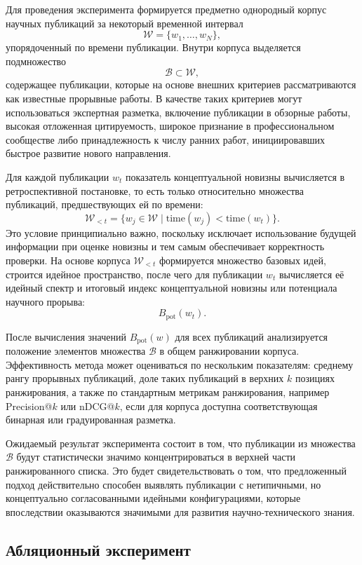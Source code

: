 \documentclass[review,3p,times]{elsarticle}
\begin{document}
Для проведения эксперимента формируется предметно однородный корпус научных публикаций за некоторый временной интервал
\[
\mathcal{W}=\{w_1,\dots,w_N\},
\]
упорядоченный по времени публикации. Внутри корпуса выделяется подмножество
\[
\mathcal{B}\subset \mathcal{W},
\]
содержащее публикации, которые на основе внешних критериев рассматриваются как известные прорывные работы. В качестве таких критериев могут использоваться экспертная разметка, включение публикации в обзорные работы, высокая отложенная цитируемость, широкое признание в профессиональном сообществе либо принадлежность к числу ранних работ, инициировавших быстрое развитие нового направления.

Для каждой публикации $w_t$ показатель концептуальной новизны вычисляется в ретроспективной постановке, то есть только относительно множества публикаций, предшествующих ей по времени:
\[
\mathcal{W}_{<t}=\{w_j \in \mathcal{W}\mid \mathrm{time}(w_j)<\mathrm{time}(w_t)\}.
\]
Это условие принципиально важно, поскольку исключает использование будущей информации при оценке новизны и тем самым обеспечивает корректность проверки. На основе корпуса $\mathcal{W}_{<t}$ формируется множество базовых идей, строится идейное пространство, после чего для публикации $w_t$ вычисляется её идейный спектр и итоговый индекс концептуальной новизны или потенциала научного прорыва:
\[
B_{\mathrm{pot}}(w_t).
\]

После вычисления значений $B_{\mathrm{pot}}(w)$ для всех публикаций анализируется положение элементов множества $\mathcal{B}$ в общем ранжировании корпуса. Эффективность метода может оцениваться по нескольким показателям: среднему рангу прорывных публикаций, доле таких публикаций в верхних $k$ позициях ранжирования, а также по стандартным метрикам ранжирования, например Precision@$k$ или nDCG@$k$, если для корпуса доступна соответствующая бинарная или градуированная разметка.

Ожидаемый результат эксперимента состоит в том, что публикации из множества $\mathcal{B}$ будут статистически значимо концентрироваться в верхней части ранжированного списка. Это будет свидетельствовать о том, что предложенный подход действительно способен выявлять публикации с нетипичными, но концептуально согласованными идейными конфигурациями, которые впоследствии оказываются значимыми для развития научно-технического знания.

\subsection{Абляционный эксперимент}
\end{document}
